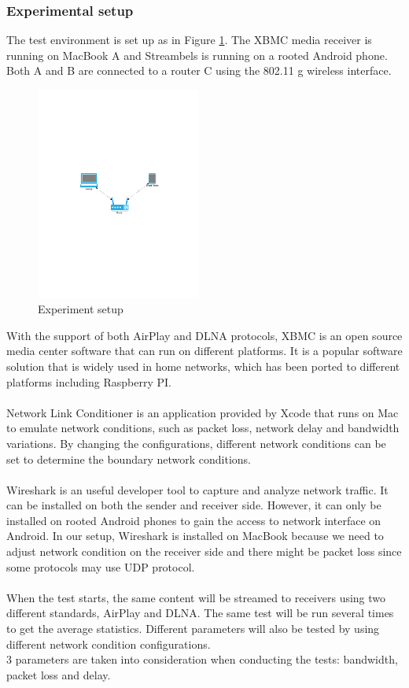 \subsubsection{Experimental setup}
The test environment is set up as in Figure \ref{setup}. The XBMC
media receiver is running on MacBook A and Streambels is running on a rooted Android phone. Both A and B are connected to a router C using the 802.11 g wireless interface. \\
\begin{figure}[htb]
\centering \includegraphics[height=7cm]{charts/experiment_setup}
\caption{Experiment setup \label{setup}}
\end{figure}
With the support of both AirPlay and DLNA protocols, XBMC is an open source media center software that can run on different platforms. It is a popular software solution that is widely used in home networks, which has been ported to different platforms including Raspberry PI.\\
\\
Network Link Conditioner is an application provided by Xcode that runs on Mac to emulate network conditions, such as packet loss, network delay and bandwidth variations. By changing the configurations, different network conditions can be set to determine the boundary network conditions.\\
\\
Wireshark is an useful developer tool to capture and analyze network traffic. It can be installed on both the sender and receiver side. However, it can only be installed on rooted Android phones to gain the access to network interface on Android. In our setup, Wireshark is installed on MacBook because we need to adjust network condition on the receiver side and there might be packet loss since some protocols may use UDP protocol.\\
\\
When the test starts, the same content will be streamed to receivers using two different standards, AirPlay and DLNA. The same test will be run several times to get the average statistics. Different parameters will also be tested by using different network condition configurations.
\\
3 parameters are taken into consideration when conducting the tests: bandwidth, packet loss and delay. 
